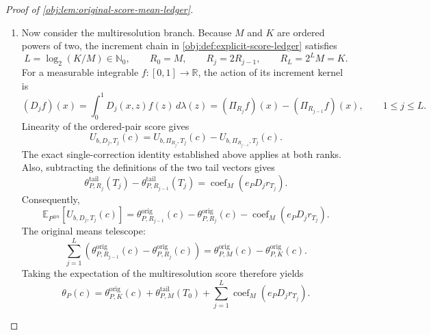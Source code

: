 \begin{proof}[Proof of \cref{obj:lem:original-score-mean-ledger}]
\begin{enumerate}
Since \(0\le e_P\le1\), and cell averaging preserves the almost-everywhere bound on \(r_T\),
\[
|e_Pr_T^{(1)}|\le10T^{1-p}\quad\text{almost everywhere},
\qquad
|e_P\Pi_Jr_T|\le10T^{1-p}\quad\text{everywhere}.
\]
The coefficient norm bound and the triangle inequality give
\[
\begin{aligned}
\|\theta^{\mathrm{tail}}_{P,J}(T)\|_2
&\le
\|\operatorname{coef}_M(e_Pr_T^{(1)})\|_2
+\|\operatorname{coef}_M(e_P\Pi_Jr_T)\|_2\\
&\le10T^{1-p}+10T^{1-p}
=20T^{1-p}.
\end{aligned}
\]
In the single-correction branch, take \(J=K\) and \(T=T_0\). Combining this estimate with the original-mean error bound gives
\[
\begin{aligned}
\|\theta_P(c)-\theta^{\mathrm{wt}}_P(c)\|_2
&\le
\|\theta^{\mathrm{orig}}_{P,K}(c)-\theta^{\mathrm{wt}}_P(c)\|_2
+\|\theta^{\mathrm{tail}}_{P,K}(T_0)\|_2\\
&\le400K^{-S}+20T_0^{1-p}
=B.
\end{aligned}
\]
This calculation applies to every \(c\in\mathbb R\).

\item
Now consider the multiresolution branch. Because \(M\) and \(K\) are ordered powers of two, the increment chain in
\cref{obj:def:explicit-score-ledger} satisfies
\[
L=\log_2(K/M)\in\mathbb N_0,
\qquad
R_0=M,\qquad R_j=2R_{j-1},\qquad R_L=2^LM=K.
\]
For a measurable integrable \(f:[0,1]\to\mathbb R\), the action of its increment kernel is
\[
(D_jf)(x)
=
\int_0^1D_j(x,z)f(z)\,d\lambda(z)
=
(\Pi_{R_j}f)(x)-(\Pi_{R_{j-1}}f)(x),
\qquad 1\le j\le L.
\]
Linearity of the ordered-pair score gives
\[
U_{b,D_j,T_j}(c)
=
U_{b,\Pi_{R_j},T_j}(c)
-
U_{b,\Pi_{R_{j-1}},T_j}(c).
\]
The exact single-correction identity established above applies at both ranks. Also, subtracting the definitions of the two tail vectors gives
\[
\theta^{\mathrm{tail}}_{P,R_j}(T_j)
-
\theta^{\mathrm{tail}}_{P,R_{j-1}}(T_j)
=
\operatorname{coef}_M(e_PD_jr_{T_j}).
\]
Consequently,
\[
\mathbb E_{P^{\otimes n}}[U_{b,D_j,T_j}(c)]
=
\theta^{\mathrm{orig}}_{P,R_{j-1}}(c)
-
\theta^{\mathrm{orig}}_{P,R_j}(c)
-
\operatorname{coef}_M(e_PD_jr_{T_j}).
\]
The original means telescope:
\[
\sum_{j=1}^L
\left(
\theta^{\mathrm{orig}}_{P,R_{j-1}}(c)
-
\theta^{\mathrm{orig}}_{P,R_j}(c)
\right)
=
\theta^{\mathrm{orig}}_{P,M}(c)
-
\theta^{\mathrm{orig}}_{P,K}(c).
\]
Taking the expectation of the multiresolution score therefore yields
\[
\theta_P(c)
=
\theta^{\mathrm{orig}}_{P,K}(c)
+
\theta^{\mathrm{tail}}_{P,M}(T_0)
+
\sum_{j=1}^L\operatorname{coef}_M(e_PD_jr_{T_j}).
\]


\end{enumerate}
\end{proof}
